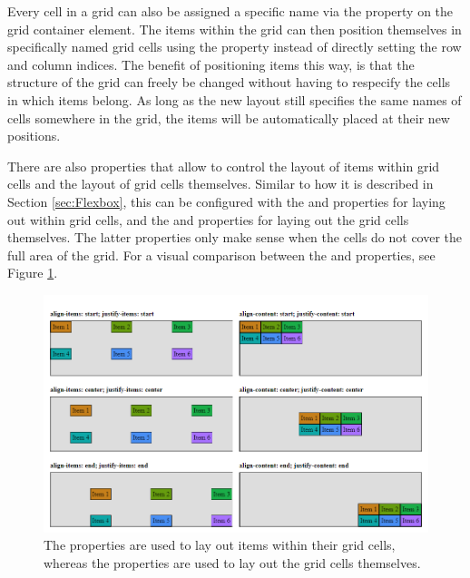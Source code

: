Every cell in a grid can also be assigned a specific name via the  property on the grid container element. 
The items within the grid can then position themselves in specifically named grid cells using the  property instead of directly setting the row and column indices. 
The benefit of positioning items this way, is that the structure of the grid can freely be changed without having to respecify the cells in which items belong. 
As long as the new layout still specifies the same names of cells somewhere in the grid, the items will be automatically placed at their new positions.

There are also properties that allow to control the layout of items within grid cells and the layout of grid cells themselves. 
Similar to how it is described in Section \ref{sec:Flexbox}, this can be configured with the  and  properties for laying out within grid cells, and the  and  properties for laying out the grid cells themselves. 
The latter  properties only make sense when the cells do not cover the full area of the grid. 
For a visual comparison between the  and  properties, see Figure \ref{fig:GridLayoutProperties}.

\begin{figure}[tp]
\centering
\includegraphics[keepaspectratio,width=\linewidth,height=\fullh / 2]{images/grid-layout-properties.png}
\caption[Grid Layout Property Comparision]{
  The  properties are used to lay out items within their grid cells, whereas the  properties are used to lay out the grid cells themselves. 
}
\label{fig:GridLayoutProperties}
\end{figure}

